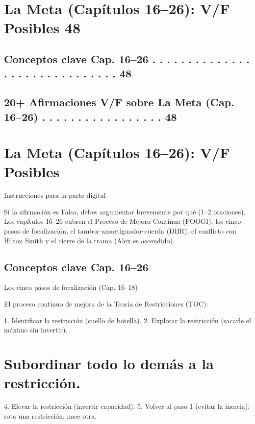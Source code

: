 \section{La Meta (Capítulos 16–26): V/F Posibles                                                           48}

\subsection{Conceptos clave Cap. 16–26 . . . . . . . . . . . . . . . . . . . . . . . . . . . . . .      48}

\subsection{20+ Afirmaciones V/F sobre La Meta (Cap. 16–26) . . . . . . . . . . . . . . . . .           48}
\section{La Meta (Capítulos 16–26): V/F Posibles}

\begin{tipprueba}{Instrucciones para la parte digital}

   Si la afirmación es Falsa, debes argumentar brevemente por qué (1–2 oraciones). Los
   capítulos 16–26 cubren el Proceso de Mejora Continua (POOGI), los cinco pasos
   de focalización, el tambor-amortiguador-cuerda (DBR), el conflicto con Hilton
   Smith y el cierre de la trama (Alex es ascendido).


\end{tipprueba}

\subsection{Conceptos clave Cap. 16–26}

\begin{definicion}{Los cinco pasos de focalización (Cap. 16–18)}

   El proceso continuo de mejora de la Teoría de Restricciones (TOC):

1. Identificar la restricción (cuello de botella).
2. Explotar la restricción (sacarle el máximo sin invertir).
\end{definicion}
\section{Subordinar todo lo demás a la restricción.}
4. Elevar la restricción (invertir capacidad).
5. Volver al paso 1 (evitar la inercia): rota una restricción, nace otra.

